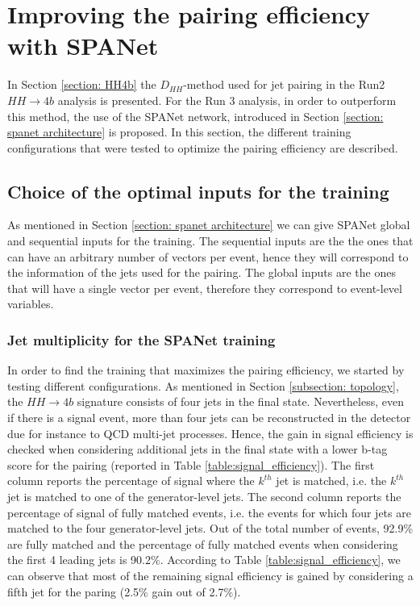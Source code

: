 \section{Improving the pairing efficiency with SPANet} \label{section: improving}

In Section \ref{section: HH4b} the $D_{HH}$-method used for jet pairing in the Run2 $HH \to 4b$ analysis is presented. For the Run 3 analysis, in order to outperform this method, the use of the SPANet network, introduced in Section \ref{section: spanet architecture} is proposed. In this section, the different training configurations that were tested to optimize the pairing efficiency are described.



\subsection{Choice of the optimal inputs for the training} \label{subsection: choice of inputs}

As mentioned in Section \ref{section: spanet architecture} we can give SPANet global and sequential inputs for the training. The sequential inputs are the the ones that can have an arbitrary number of vectors per event, hence they will correspond to the information of the jets used for the pairing. The global inputs are the ones that will have a single vector per event, therefore they correspond to event-level variables.

\subsubsection{Jet multiplicity for the SPANet training}

In order to find the training that maximizes the pairing efficiency, we started by testing different configurations. As mentioned in Section \ref{subsection: topology}, the $HH \to 4b$ signature consists of four jets in the final state. Nevertheless, even if there is a signal event, more than four jets can be reconstructed in the detector due for instance to QCD multi-jet processes.
Hence, the gain in signal efficiency is checked when considering additional jets in the final state with a lower b-tag score for the pairing (reported in Table \ref{table:signal_efficiency}). The first column reports the percentage of signal where the $k^{th}$ jet is matched, i.e. the $k^{th}$ jet is matched to one of the generator-level jets. The second column reports the percentage of signal of fully matched events, i.e. the events for which four jets are matched to the four generator-level jets. Out of the total number of events, 92.9\% are fully matched and the percentage of fully matched events when considering the first 4 leading jets is 90.2\%. According to Table \ref{table:signal_efficiency}, we can observe that most of the remaining signal efficiency is gained by considering a fifth jet for the paring (2.5\% gain out of 2.7\%). 

